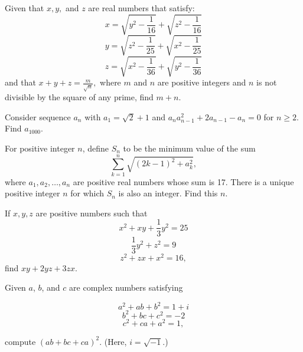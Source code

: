 \documentclass[mast]{lucky}
\begin{document}
\begin{req}[AIME II 2006/15]{4}
Given that $x, y,$ and $z$ are real numbers that satisfy:
\[x = \sqrt{y^2-\frac{1}{16}}+\sqrt{z^2-\frac{1}{16}}\]
\[y = \sqrt{z^2-\frac{1}{25}}+\sqrt{x^2-\frac{1}{25}}\]
\[z = \sqrt{x^2-\frac{1}{36}}+\sqrt{y^2-\frac{1}{36}}\]
and that $x+y+z = \frac{m}{\sqrt{n}},$ where $m$ and $n$ are positive integers and $n$ is not divisible by the square of any prime, find $m+n.$
\end{req}


\begin{prob}[]{4}
Consider sequence $a_n$ with $a_1=\sqrt{2}+1$ and $a_na_{n-1}^2+2a_{n-1}-a_n=0$ for $n\geq 2.$ Find $a_{1000}.$
\end{prob}

\begin{prob}[AIME 1991/15]{6}
For positive integer $n$, define $S_n$ to be the minimum value of the sum\[ \sum_{k=1}^n \sqrt{(2k-1)^2+a_k^2}, \]where $a_1,a_2,\ldots,a_n$ are positive real numbers whose sum is 17. There is a unique positive integer $n$ for which $S_n$ is also an integer. Find this $n$.
\end{prob}


\begin{prob}[]{6}
If $x,y,z$ are positive numbers such that
    \[x^2+xy+\frac{1}{3}y^2=25\]
    \[\frac{1}{3}y^2+z^2=9\]
    \[z^2+zx+x^2=16,\]
    find $xy+2yz+3zx.$
\end{prob}

\begin{prob}{9}
Given $a$, $b$, and $c$ are complex numbers satisfying

\[ a^2+ab+b^2=1+i \]
\[ b^2+bc+c^2=-2 \]
\[ c^2+ca+a^2=1, \]

compute $(ab+bc+ca)^2$. (Here, $i=\sqrt{-1}$.)
\end{prob}
\end{document}
